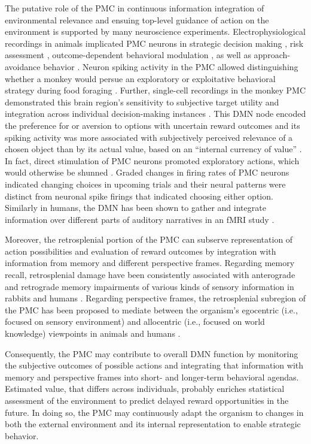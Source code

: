 \documentclass[10pt,letterpaper]{article}
\begin{document}
The putative role of the PMC in continuous information integration of
environmental relevance
and ensuing top-level guidance of action on the environment is supported
by many neuroscience experiments.
Electrophysiological recordings in animals implicated PMC neurons in
strategic decision making \citep{pearson2009neurons},
risk assessment \citep{mccoy2005risk},
outcome-dependent behavioral modulation \citep{hayden2009electrophysiological},
as well as approach-avoidance behavior
\citep{vann2009does}.
Neuron spiking activity in the PMC allowed distinguishing
whether a monkey would persue an exploratory or exploitative
behavioral strategy during food foraging \citep{pearson2009neurons}.
Further, single-cell recordings in the monkey PMC
demonstrated this brain region's sensitivity to
subjective target utility \citep{mccoy2005risk} and integration
across individual decision-making instances \citep{pearson2009neurons}.
This DMN node encoded the
preference for or aversion to options with uncertain reward outcomes
and its spiking activity was more associated with
subjectively perceived relevance of a chosen object
than by its actual value,
based on an ``internal currency of value'' \citep{mccoy2005risk}.
In fact, direct stimulation of PMC neurons
promoted exploratory actions,
which would otherwise be shunned \citep{hayden2008stim}.
Graded changes in firing rates of PMC neurons
indicated changing choices in upcoming trials and their neural patterns were
distinct from neuronal spike firings that indicated choosing either option.
Similarly in humans,
the DMN has been shown to gather and integrate information
over different parts of auditory narratives in an fMRI study
\citep{simony2016dynamic}.


Moreover, the retrosplenial portion of the PMC can subserve
representation of action possibilities
and evaluation of reward outcomes by integration with
information from memory and different perspective frames.
Regarding memory recall, retrosplenial damage have been
consistently associated with anterograde and retrograde memory impairments
of various kinds of sensory information
in rabbits and humans
\citep{vann2009does}.
Regarding perspective frames, the retrosplenial subregion of the PMC has been
proposed to mediate between the organism's egocentric
(i.e., focused on sensory environment) and
allocentric (i.e., focused on world knowledge) viewpoints
in animals and humans
\citep{epstein2008parahippocampal, burgess2008spatial, valiquette2007different}.



Consequently, the PMC may contribute to overall DMN function
by monitoring the subjective outcomes
of possible actions and integrating that information
with memory and perspective frames
into short- and longer-term behavioral agendas.
Estimated value, that differs across individuals, probably enriches
statistical assessment of the environment
to predict delayed reward opportunities in the future.
In doing so, the PMC may continuously adapt the organism to changes
in both the external environment and its internal representation
to enable strategic behavior.
\end{document}
